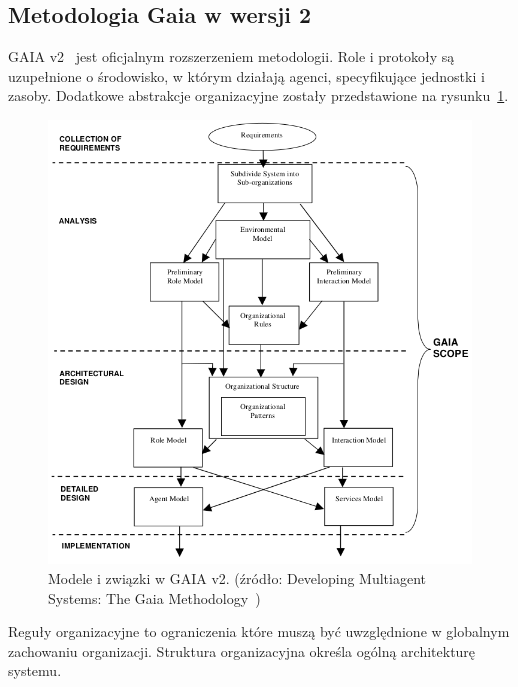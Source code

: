 \documentclass[11pt]{report}
\begin{document}
    \subsection{Metodologia Gaia w wersji 2}
    GAIA v2~\cite{Zambonelli2003} jest oficjalnym rozszerzeniem metodologii.
    Role i protokoły są uzupełnione o środowisko, w którym działają agenci, specyfikujące jednostki i zasoby.
    Dodatkowe abstrakcje organizacyjne zostały przedstawione na rysunku~\ref{fig:gaia_v2}.
    \begin{figure}[!ht]
        \centering
        \includegraphics[width=\linewidth]{fig/gaia2 models.png}
        \caption{Modele i związki w GAIA v2. (źródło: Developing Multiagent Systems: The Gaia Methodology~\cite{Zambonelli2003})}
        \label{fig:gaia_v2}
    \end{figure}
    Reguły organizacyjne to ograniczenia które muszą być uwzględnione w globalnym zachowaniu organizacji.
    Struktura organizacyjna określa ogólną architekturę systemu.
\end{document}
